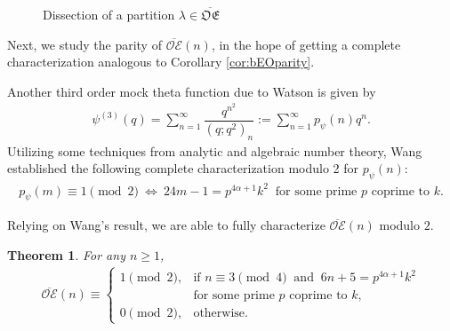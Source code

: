 \documentclass[12pt,reqno]{amsart}
\numberwithin{equation}{section}
\theoremstyle{plain}
\newtheorem{theorem}{Theorem}[section]
\theoremstyle{definition}
\def\bOE{\overline{\mathcal{OE}}}
\def\bfOE{\overline{\mathfrak{OE}}}
\begin{document}
\begin{figure}[tbh]
\begin{ferrers}[0.7]

\end{ferrers}
\caption{Dissection of a partition $\lambda\in\bfOE$}
\label{fig:boe-dissect}
\end{figure}

Next, we study the parity of $\overline{\mathcal{OE}}(n)$, in the hope of getting a complete characterization
analogous to Corollary \ref{cor:bEOparity}.

Another third order mock theta function due to Watson \cite[p. 62]{Wat} is given by
\begin{align}\label{def:psi}
\psi^{(3)}(q)=\sum_{n=1}^\infty\dfrac{q^{n^2}}{(q;q^2)_n}:=\sum_{n=1}^\infty p_\psi(n)q^n.
\end{align}
Utilizing some techniques from analytic and algebraic number theory, Wang \cite[Theorem 4.2]{Wang}
established the following complete characterization modulo 2 for $p_\psi(n)$:
\begin{align}
p_\psi(m)\equiv1\pmod{2}~\Longleftrightarrow~24m-1=p^{4\alpha+1}k^2\;\;
\textrm{for~some~prime~$p$~coprime~to~$k$}.\label{cha-mod-2}
\end{align}

Relying on Wang's result, we are able to fully characterize $\bOE(n)$ modulo $2$.

\begin{theorem}\label{thm:bOEparity}
For any $n\geq1$,
\begin{align}\label{bOEparity}
\bOE(n)\equiv
\begin{cases}
1 \pmod 2, &\textrm{if~$n\equiv3\pmod4$}\;\;\textrm{and}\;\;6n+5=p^{4\alpha+1}k^2\\
  &\textrm{for~some~prime~$p$~coprime~to~$k$},\\
0 \pmod 2, &\textrm{otherwise}.
\end{cases}
\end{align}
\end{theorem}
\end{document}
